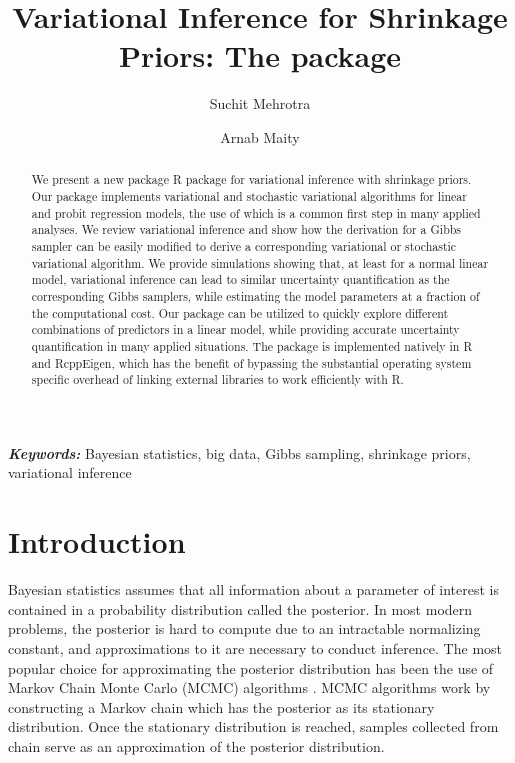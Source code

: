 \documentclass[]{article}
\title{Variational Inference for Shrinkage Priors: The \proglang{R} package 
\pkg{vir}}
\author[1]{Suchit Mehrotra}
\author[1]{Arnab Maity}
\affil[1]{Department of Statistics, North Carolina State University}
\date{}
\let\proglang=\textsf
\newcommand{\pkg}[1]{{\fontseries{b}\selectfont #1}}
\providecommand{\keywords}[1]{\textbf{\textit{Keywords:}} #1}
\begin{document}
	
\maketitle

\doublespacing

\begin{abstract} 
\noindent We present a new package \proglang{R} package for variational 
inference with
shrinkage priors. Our package implements variational and stochastic variational 
algorithms for linear and probit regression models, the use of which is a 
common first step in many applied analyses. We review variational inference and 
show how the derivation for a Gibbs sampler can be easily modified to derive a 
corresponding variational or stochastic variational algorithm. We provide 
simulations showing that, at least for a normal linear model, variational inference 
can 
lead to similar uncertainty quantification as the corresponding Gibbs samplers, 
while estimating the model parameters at a fraction of the computational cost. 
Our package can be utilized to quickly explore different combinations of 
predictors in a linear model, while providing accurate uncertainty quantification in 
many applied situations.
The package is implemented natively in
\proglang{R} and \pkg{RcppEigen}, which has the benefit of bypassing the
substantial operating system specific overhead of linking external libraries to
work efficiently with \proglang{R}.
\end{abstract}

\keywords{Bayesian statistics, big data, Gibbs sampling, shrinkage priors, 
variational inference}

\section{Introduction} \label{sec:vir:intro}

Bayesian statistics assumes that all information about a parameter of interest
is contained in a probability distribution called the posterior. In most modern
problems, the posterior is hard to compute due to an intractable normalizing
constant, and approximations to it are necessary to conduct inference. The most
popular choice for approximating the posterior distribution has been the use of
Markov Chain Monte Carlo (MCMC) algorithms \citep{robert2013monte}.  MCMC
algorithms work by constructing a Markov chain which has the posterior as its
stationary distribution. Once the stationary distribution is reached, samples
collected from chain serve as an approximation of the posterior distribution. 
\end{document}
